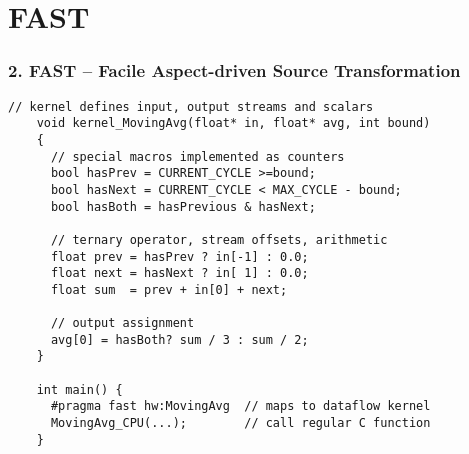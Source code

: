 \section{FAST}

\begin{frame}[fragile]
  \frametitle{2. FAST -- Facile Aspect-driven Source Transformation}

  \begin{lstlisting}[style=MaxC,   basicstyle=\scriptsize]
    // kernel defines input, output streams and scalars
    void kernel_MovingAvg(float* in, float* avg, int bound)
    {
      // special macros implemented as counters
      bool hasPrev = CURRENT_CYCLE >=bound;
      bool hasNext = CURRENT_CYCLE < MAX_CYCLE - bound;
      bool hasBoth = hasPrevious & hasNext;

      // ternary operator, stream offsets, arithmetic
      float prev = hasPrev ? in[-1] : 0.0;
      float next = hasNext ? in[ 1] : 0.0;
      float sum  = prev + in[0] + next;

      // output assignment
      avg[0] = hasBoth? sum / 3 : sum / 2;
    }

    int main() {
      #pragma fast hw:MovingAvg  // maps to dataflow kernel
      MovingAvg_CPU(...);        // call regular C function
    }
  \end{lstlisting}
\end{frame}

